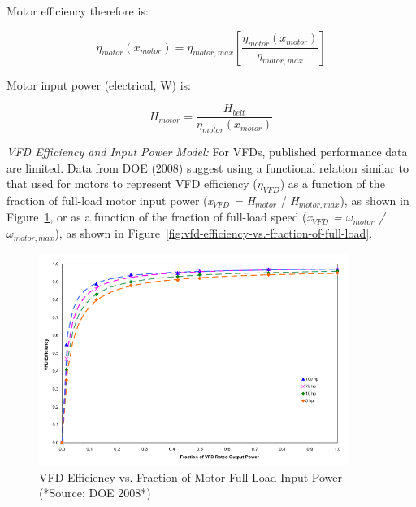 Motor efficiency therefore is:

\begin{equation}
{\eta_{motor}}({x_{motor}}) = {\eta_{motor,max}}\left[ {\frac{{{\eta_{motor}}({x_{motor}})}}{{{\eta_{motor,max}}}}} \right]
\end{equation}

Motor input power (electrical, W) is:

\begin{equation}
{H_{motor}} = \frac{{{H_{belt}}}}{{{\eta_{motor}}({x_{motor}})}}
\end{equation}

\emph{VFD Efficiency and Input Power Model:} For VFDs, published performance data are limited. Data from DOE (2008) suggest using a functional relation similar to that used for motors to represent VFD efficiency (\(\eta_{VFD}\)) as a function of the fraction of full-load motor input power (\emph{x\(_{VFD}\) = H\(_{motor}\)} / \emph{H\(_{motor,max}\)}), as shown in Figure~\ref{fig:vfd-efficiency-vs.-fraction-of-motor-full}, or as a function of the fraction of full-load speed (\emph{x\(_{VFD}\) = \(\omega_{motor}\) / \(\omega_{motor,max}\)}), as shown in Figure~\ref{fig:vfd-efficiency-vs.-fraction-of-full-load}.

\begin{figure}[hbtp] %
\centering
\includegraphics[width=0.9\textwidth, height=0.9\textheight, keepaspectratio=true]{media/image4923.svg.png}
\caption{VFD Efficiency vs. Fraction of Motor Full-Load Input Power (*Source: DOE 2008*) \protect \label{fig:vfd-efficiency-vs.-fraction-of-motor-full}}
\end{figure}

